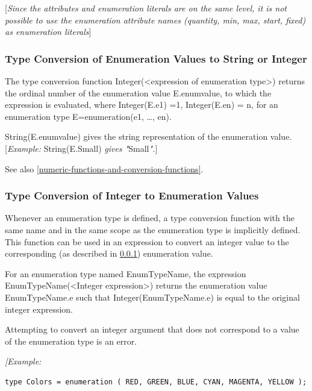 \documentclass[10pt,a4paper]{report}
\def\doublelabel#1{\label{#1}\hypertarget{#1}{}}
\begin{document}
{[}\emph{Since the attributes and enumeration literals are on the same
level, it is not possible to use the enumeration attribute names
(quantity, min, max, start, fixed) as enumeration literals}{]}

\subsubsection{Type Conversion of Enumeration Values to String or Integer}\doublelabel{type-conversion-of-enumeration-values-to-string-or-integer}

The type conversion function Integer(\textless{}expression of
enumeration type\textgreater{}) returns the ordinal number of the
enumeration value E.enumvalue, to which the expression is evaluated,
where Integer(E.e1) =1, Integer(E.en) = n, for an enumeration type
E=enumeration(e1, \ldots{}, en).

String(E.enumvalue) gives the string representation of the enumeration
value. {[}\emph{Example:} String(E.Small) \emph{gives
"}Small\emph{".}{]}

See also \ref{numeric-functions-and-conversion-functions}.

\subsubsection{Type Conversion of Integer to Enumeration Values}\doublelabel{type-conversion-of-integer-to-enumeration-values}

Whenever an enumeration type is defined, a type conversion function with
the same name and in the same scope as the enumeration type is
implicitly defined. This function can be used in an expression to
convert an integer value to the corresponding (as described in \ref{type-conversion-of-enumeration-values-to-string-or-integer}) enumeration value.

For an enumeration type named EnumTypeName, the expression
EnumTypeName(\textless{}Integer expression\textgreater{}) returns the
enumeration value EnumTypeName.e such that Integer(EnumTypeName.e) is
equal to the original integer expression.

Attempting to convert an integer argument that does not correspond to a
value of the enumeration type is an error.

\emph{{[}Example: }
\begin{lstlisting}[language=Modelica]
type Colors = enumeration ( RED, GREEN, BLUE, CYAN, MAGENTA, YELLOW );
\end{lstlisting}
\end{document}
